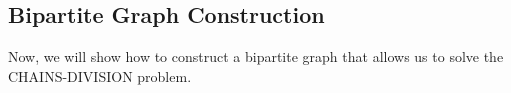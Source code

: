 \begin{comment}
\subsection{Reduction idea}
The intuition behind the reduction is the following: given a tree $T$ and the number of chains $p$, we can construct a bipartite graph $G = (V, E)$ in which a perfect matching (\cref{def:matching}) always exists. In turn, a perfect matching with minimum weight allows us to retrieve the optimal partition of the nodes of $T$ into $p$ chains such that the run-length encoding of each chain is minimized.

In the following sections we will show how to construct the bipartite graph $G$ and proof that $G$ constructed as defined in \cref{def:bip_construction} always allows to find a perfect matching and the weight of the matching is the minimum run length encoding of the optimal partition of the nodes of $T$ into $p$ chains.

\alessio{Introduci il bipartite graph con troppa cattiveria :). Prima abbiamo parlato di alberi, adesso subito di grafi bipartiti. La soluzione con grafo bipartito è quella che hai voluto seguire tu, quindi dovresti introdurla più come una scelta implementativa, che come un dato di fatto. In breve, dovresti dimostrare qua che Chains-Div. si riduce al MWBGP, quindi sarebbe da girare un attimo l'ordine: Se abbiamo un grafo con un perfect matching allora possiamo ridurre il problema -> creiamo un grafo in questo modo -> contiene un perfect matching -> possiamo sempre fare la riduzione.} \davide{Ho aggiunto un paragrafo introduttivo.. può andare o intendevi proprio girare tutta la dimostrazione?}
\alessio{Se l'esistenza perfect matching è sufficiente a fare la riduzione, secondo me è meglio girare l'ordine delle dimostrazioni. Altrimenti, se per la riduzione ti servono le proprietà specifiche del grafo che hai creato allora va bene questo ordine. Pensandoci, puoi riportare questa discussione nell'intrduzione della sezione 6.2, mettendo qualcosa tipo ``In particular we show that, given a tree $T$ and the number of chains $p$, we can construct a bipartite ...'' tra i due paragrafi che ci sono già. (occhio alle frasi troppo lunghe).}
\end{comment}

\subsection{Bipartite Graph Construction}
Now, we will show how to construct a bipartite graph that allows us to solve the \textsc{CHAINS-DIVISION} problem.

